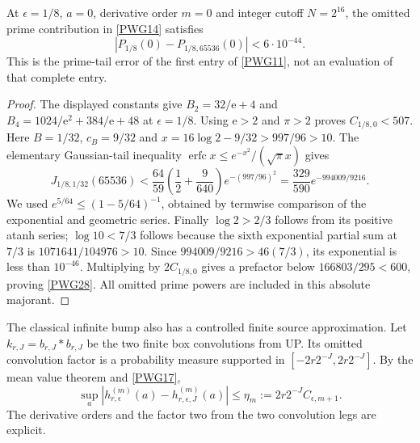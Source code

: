 \begin{corollary}
At $\epsilon=1/8$, $a=0$, derivative order $m=0$ and integer cutoff $N=2^{16}$, the omitted prime contribution in \eqref{PWG14} satisfies
\begin{equation}
 \boxed{|P_{1/8}(0)-P_{1/8,65536}(0)|<6\cdot10^{-44}.}
                                                               \tag{PWG28}\label{PWG28}
\end{equation}
This is the prime-tail error of the first entry of \eqref{PWG11}, not an evaluation of that complete entry.
\end{corollary}
\begin{proof}
The displayed constants give
$B_2=32/\mathrm e+4$ and
$B_4=1024/\mathrm e^2+384/\mathrm e+48$ at $\epsilon=1/8$.
Using $\mathrm e>2$ and $\pi>2$ proves $C_{1/8,0}<507$.
Here $B=1/32$, $c_B=9/32$ and
$x=16\log2-9/32>997/96>10$.
The elementary Gaussian-tail inequality
$\operatorname{erfc}x\le e^{-x^2}/(\sqrt\pi x)$ gives
\[
 J_{1/8,1/32}(65536)
 <\frac{64}{59}\left(\frac12+\frac9{640}\right)
       e^{-(997/96)^2}=\frac{329}{590}e^{-994009/9216}.
\]
We used $e^{5/64}\le(1-5/64)^{-1}$, obtained by termwise comparison of the exponential and geometric series. Finally $\log2>2/3$ follows from its positive atanh series; $\log10<7/3$ follows because the sixth exponential partial sum at $7/3$ is $1071641/104976>10$.
Since $994009/9216>46(7/3)$, its exponential is less than $10^{-46}$.
Multiplying by $2C_{1/8,0}$ gives a prefactor below $166803/295<600$, proving \eqref{PWG28}. All omitted prime powers are included in this absolute majorant.
\end{proof}

The classical infinite bump also has a controlled finite source approximation. Let $k_{r,J}=b_{r,J}*b_{r,J}$ be the two finite box convolutions from UP. Its omitted convolution factor is a probability measure supported in
$[-2r2^{-J},2r2^{-J}]$. By the mean value theorem and \eqref{PWG17},
\begin{equation}
 \sup_a|h_{r,\epsilon}^{(m)}(a)-h_{r,\epsilon,J}^{(m)}(a)|
 \le\eta_m:=2r2^{-J}C_{\epsilon,m+1}.                        \tag{PWG20}\label{PWG20}
\end{equation}
The derivative orders and the factor two from the two convolution legs are explicit.

